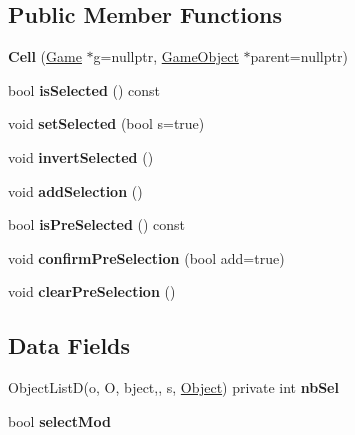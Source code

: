 \subsection*{\-Public \-Member \-Functions}
\begin{DoxyCompactItemize}
\item 
\hypertarget{class_cell_ad2edfbf561021e72a464888921c0b576}{{\bfseries \-Cell} (\hyperlink{class_game}{\-Game} $\ast$g=nullptr, \hyperlink{class_game_object}{\-Game\-Object} $\ast$parent=nullptr)}\label{class_cell_ad2edfbf561021e72a464888921c0b576}

\item 
\hypertarget{class_cell_a394830e18401f3b414c3dde4a2b4e2e8}{bool {\bfseries is\-Selected} () const }\label{class_cell_a394830e18401f3b414c3dde4a2b4e2e8}

\item 
\hypertarget{class_cell_a40146bbb2b74cf56337462abc4d0327c}{void {\bfseries set\-Selected} (bool s=true)}\label{class_cell_a40146bbb2b74cf56337462abc4d0327c}

\item 
\hypertarget{class_cell_ad8310bd5ddbdcb3ab3036356556b32b3}{void {\bfseries invert\-Selected} ()}\label{class_cell_ad8310bd5ddbdcb3ab3036356556b32b3}

\item 
\hypertarget{class_cell_a9801c2d435d44834bd14a80fba778618}{void {\bfseries add\-Selection} ()}\label{class_cell_a9801c2d435d44834bd14a80fba778618}

\item 
\hypertarget{class_cell_aa7456089022c5d2dabd4325d03007759}{bool {\bfseries is\-Pre\-Selected} () const }\label{class_cell_aa7456089022c5d2dabd4325d03007759}

\item 
\hypertarget{class_cell_a16f6d41be75c42ad20ad29d0b5725ece}{void {\bfseries confirm\-Pre\-Selection} (bool add=true)}\label{class_cell_a16f6d41be75c42ad20ad29d0b5725ece}

\item 
\hypertarget{class_cell_aa0704872b8d4ae7f40022cfebfa48944}{void {\bfseries clear\-Pre\-Selection} ()}\label{class_cell_aa0704872b8d4ae7f40022cfebfa48944}

\end{DoxyCompactItemize}
\subsection*{\-Data \-Fields}
\begin{DoxyCompactItemize}
\item 
\hypertarget{class_cell_a70f60ede53fb663eb11dd543211bf4cf}{\-Object\-List\-D(o, \-O, bject,, s, \*
\hyperlink{class_object}{\-Object}) private int {\bfseries nb\-Sel}}\label{class_cell_a70f60ede53fb663eb11dd543211bf4cf}

\item 
\hypertarget{class_cell_a5891847674379c2fd25a4d08962a21ba}{bool {\bfseries select\-Mod}}\label{class_cell_a5891847674379c2fd25a4d08962a21ba}

\end{DoxyCompactItemize}


